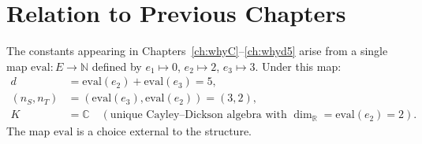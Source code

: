 \section{Relation to Previous Chapters}

The constants appearing in Chapters~\ref{ch:whyC}--\ref{ch:whyd5}
arise from a single map $\mathrm{eval}: E \to \mathbb{N}$
defined by $e_1 \mapsto 0$, $e_2 \mapsto 2$, $e_3 \mapsto 3$.
Under this map:
\begin{align*}
d &= \mathrm{eval}(e_2) + \mathrm{eval}(e_3) = 5, \\
(n_S, n_T) &= (\mathrm{eval}(e_3), \mathrm{eval}(e_2))
  = (3, 2), \\
K &= \mathbb{C} \quad
  (\text{unique Cayley--Dickson algebra with }
  \dim_{\mathbb{R}} = \mathrm{eval}(e_2) = 2).
\end{align*}
The map $\mathrm{eval}$ is a choice external to the structure.
